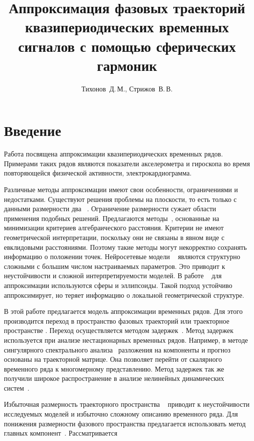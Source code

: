 \documentclass[12pt,twoside]{article}
\title
    [Аппроксимация фазовой траектории] 
    {Аппроксимация фазовых траекторий квазипериодических временных сигналов с помощью сферических гармоник}
\author
    {Тихонов~Д.\,М., Стрижов~В.\,В.} %
\begin{document}
\maketitle

\section{Введение}
Работа посвящена аппроксимации квазипериодических временных рядов.
Примерами таких рядов являются показатели акселерометра и гироскопа во время повторяющейся физической активности, электрокардиограмма.

Различные методы аппроксимации имеют свои особенности, ограничениями и недостатками.
Существуют решения проблемы на плоскости, то есть только с данными размерности два ~\cite{Fitzgibbon1999, Ahn1998}.
Ограничение размерности сужает области применения подобных решений.
Предлагаются методы~\cite{Fitzgibbon1999, Rosin1995}, основанные на минимизации критериев алгебраического расстояния.
Критерии не имеют геометрической интерпретации, поскольку они не связаны в явном виде с евклидовыми расстояниями.
Поэтому такие методы могут некорректно сохранять информацию о положении точек.
Нейросетевые модели ~\cite{Andras2017, Cheridito2021} являются структурно сложными с большим числом настраиваемых параметров.
Это приводит к неустойчивости и сложной интерпретируемости моделей.
В работе ~\cite{Calafiore2002} для аппроксимации используются  сферы и эллипсоиды.
Такой подход устойчиво аппроксимирует, но теряет информацию о локальной геометрической структуре.
	
В этой работе предлагается модель аппроксимации временных рядов.
Для этого производится переход в пространство фазовых траекторий или траекторное пространстве .
Переход осуществляется методом задержек~\cite{LAI19961}.
Метод задержек используется при анализе нестационарных временных рядов.
Например, в методе сингулярного спектрального анализа~\cite{Golyandina2002} разложения на компоненты и прогноз основаны на траекторной матрице.
Она позволяет перейти от скалярного временного ряда к многомерному представлению.
Метод задержек так же получили широкое распространение в анализе нелинейных динамических систем~\cite{Takens1981, LAI19961}.

Избыточная размерность траекторного пространства ~\cite{Golyandina2002, Motrenko2015,Usmanova2020} приводит к неустойчивости исследуемых моделей и избыточно сложному описанию временного ряда.
Для понижения размерности фазового пространства предлагается использовать  метод главных компонент~\cite{Ezukwoke2019, Scholkopf1998}. Рассматривается
\end{document}
